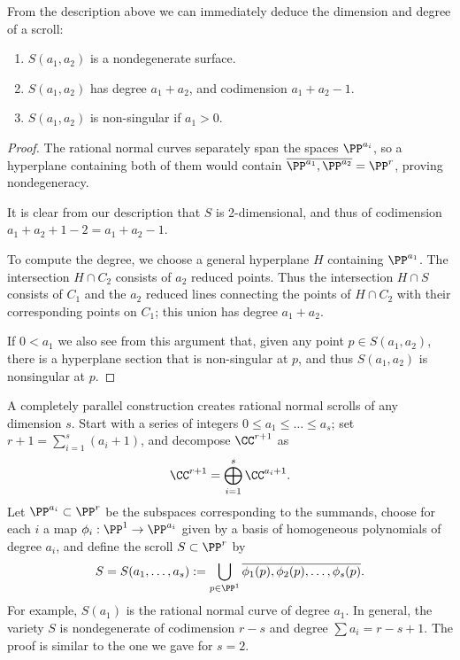 From the description above we can immediately deduce the dimension and degree of a scroll:

\begin{proposition}
\begin{enumerate}
\item $S(a_1,a_2)$ is a nondegenerate surface.
 \item $S(a_1,a_2)$ has degree $a_1+a_2$, and codimension $a_1+a_2-1.$
 \item $S(a_{1},a_{2})$ is non-singular if $a_{1}>0$.
 \end{enumerate}
\end{proposition}\label{deg and codim}

\begin{proof}
 The rational normal curves separately span the spaces $\PP^{a_i}$, so a hyperplane containing both of them would contain $\overline{\PP^{a_1}, \PP^{a_{2}}} = \PP^r$, proving nondegeneracy. 
 
 It is clear from our description that $S$ is 2-dimensional, and thus of
codimension $a_{1}+a_{2}+1 -2 = a_{1}+a_{2}-1$. 

To compute the degree, we choose a general hyperplane $H$ containing $\PP^{a_{1}}$. The intersection $H\cap C_{2}$ consists of $a_{2}$ reduced points. Thus the intersection $H\cap S$ consists of $C_{1}$ and the $a_{2}$ reduced lines connecting 
the points of $H\cap C_{2}$ with their corresponding points on $C_{1}$; this union has degree $a_{1}+a_{2}$.

If $0< a_{1}$ we also see from this argument that, given any point  $p\in S(a_{1},a_{2})$, there is
a hyperplane section that is non-singular at $p$, and thus $S(a_{1},a_{2})$ is nonsingular at $p$.
\end{proof}

A completely parallel construction creates rational normal scrolls of any dimension $s$. Start with a series of integers $0 \leq a_1 \leq \dots \leq a_s$;
set $r + 1 = \sum_{i=1}^{s}(a_{i}+1)$,  and
decompose $\CC^{r+1}$ as
$$
\CC^{r+1} = \bigoplus_{i=1}^{s}\CC^{a_{i}+1}.
$$
Let $\PP^{a_{i}}\subset \PP^{r}$ be the subspaces corresponding to the summands,  choose for each $i$ a
map $\phi_i : \PP^1 \to \PP^{a_{i}}$  given by a basis of homogeneous polynomials of degree $a_i$, and define the scroll $S \subset \PP^{r}$ by
$$
S=S(a_{1}, \dots, a_{s}) := \bigcup_{p\in \PP^{1}}\overline{\phi_1(p), \phi_{2}(p), \dots, \phi_{s}(p)}.
$$
For example, $S(a_{1})$ is the rational normal curve of degree $a_{1}$. In general, the variety $S$ is nondegenerate of codimension $r-s$ and degree $\sum a_{i} = r-s+1$. The proof is similar to the one we gave for $s=2$.

